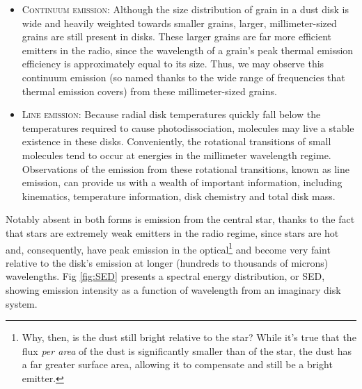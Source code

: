 \begin{itemize}



  \item \textsc{Continuum emission}: Although the size distribution of grain in a dust disk is wide and heavily weighted towards smaller grains, larger, millimeter-sized grains are still present in disks. These larger grains are far more efficient emitters in the radio, since the wavelength of a grain's peak thermal emission efficiency is approximately equal to its size. Thus, we may observe this continuum emission (so named thanks to the wide range of frequencies that thermal emission covers) from these millimeter-sized grains.

  \item \textsc{Line emission}: Because radial disk temperatures quickly fall below the temperatures required to cause photodissociation, molecules may live a stable existence in these disks. Conveniently, the rotational transitions of small molecules tend to occur at energies in the millimeter wavelength regime. Observations of the emission from these rotational transitions, known as line emission, can provide us with a wealth of important information, including kinematics, temperature information, disk chemistry and total disk mass.
\end{itemize}


Notably absent in both forms is emission from the central star, thanks to the fact that stars are extremely weak emitters in the radio regime, since stars are hot and, consequently, have peak emission in the optical\footnote{Why, then, is the dust still bright relative to the star? While it's true that the flux \textit{per area} of the dust is significantly smaller than of the star, the dust has a far greater surface area, allowing it to compensate and still be a bright emitter.} and become very faint relative to the disk's emission at longer (hundreds to thousands of microns) wavelengths. Fig \ref{fig:SED} presents a spectral energy distribution, or SED, showing emission intensity as a function of wavelength from an imaginary disk system.



